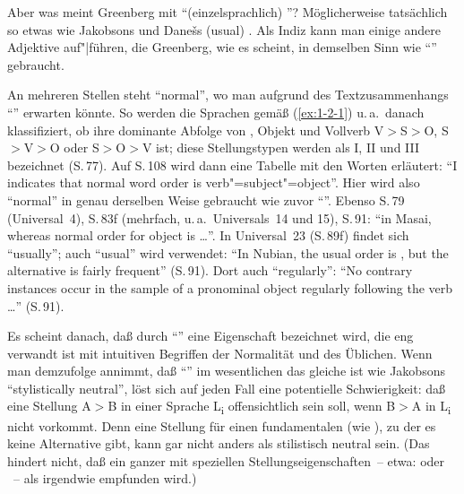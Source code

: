 \documentclass[output=paper]{langsci/langscibook}
\begin{document}
\ssubsection{}%
\label{subsec:1-2.3}
Aber was meint Greenberg mit "`(einzelsprachlich) "'? Möglicherweise tatsächlich so etwas wie Jakobsons  und Dane\v{s}s 
(usual) . Als Indiz kann man einige andere Adjektive auf"|führen, die
Greenberg, wie es scheint, in demselben Sinn wie "`"' gebraucht.

An mehreren Stellen steht "`normal"', wo man aufgrund des Textzusammenhangs
"`"' erwarten könnte. So werden die Sprachen gemäß (\ref{ex:1-2-1}) u.\,a.\ danach klassifiziert, ob ihre dominante Abfolge von , Objekt und Vollverb V$>$S$>$O, S$>$V$>$O
oder S$>$O$>$V ist; diese Stellungstypen werden als I, II und III bezeichnet (S.\,77). Auf
S.\,108 wird dann eine Tabelle mit den Worten erläutert: "`I indicates that normal
word order is verb"=subject"=object"'. Hier wird also "`normal"' in genau derselben Weise gebraucht wie zuvor "`"'. Ebenso \zb S.\,79 (Universal~4), S.\,83f (mehrfach,
u.\,a.\ Universals~14 und 15), S.\,91: "`in Masai, whereas normal order for  object
is  \ldots"'. In Universal~23 (S.\,89f) findet sich "`usually"'; auch "`usual"' wird verwendet: "`In Nubian, the usual  order is , but the alternative  is fairly frequent"' (S.\,91). Dort auch "`regularly"': "`No contrary instances occur in the sample of
a pronominal object regularly following the verb \ldots"' (S.\,91).

Es scheint danach, daß durch "`"' eine Eigenschaft bezeichnet
wird, die eng verwandt ist mit intuitiven Begriffen der Normalität und
des Üblichen. Wenn man demzufolge annimmt, daß "`"' im
wesentlichen das gleiche ist wie Jakobsons "`stylistically neutral"',
löst sich auf jeden Fall eine potentielle Schwierigkeit: daß eine
Stellung A$>$B in einer Sprache L\textsubscript{i} offensichtlich
 sein soll, wenn B$>$A in L\textsubscript{i} nicht
vorkommt. Denn eine Stellung für einen fundamentalen  (wie
), zu der es keine Alternative gibt, kann gar
nicht anders als stilistisch neutral sein. (Das hindert nicht, daß ein
ganzer  mit speziellen Stellungseigenschaften~-- etwa:
 oder ~-- als irgendwie 
empfunden wird.)
\end{document}
